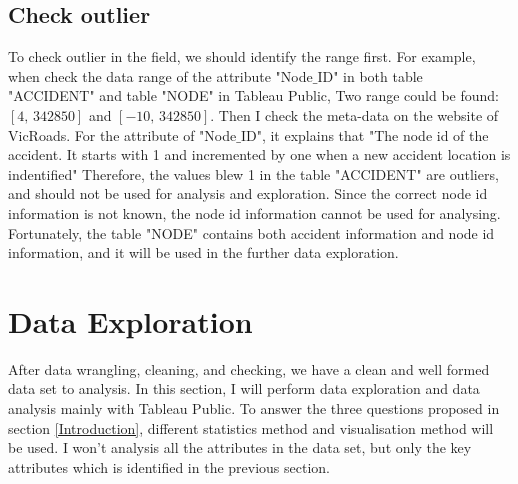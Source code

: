 \documentclass[11pt]{article}
\theoremstyle{definition}
\begin{document}
\subsection{Check outlier}
To check outlier in the field, we should identify the range first. For example, when check the data range of the attribute "Node$\_$ID" in both table "ACCIDENT" and table "NODE" in Tableau Public, Two range could be found: $[4,\,342850]$ and $[-10,\,342850]$. Then I check the meta-data on the website of VicRoads. For the attribute of "Node$\_$ID", it explains that "The node id of the accident. It starts with 1 and incremented by one when a new accident location is indentified" %
Therefore, the values blew 1 in the table "ACCIDENT" are outliers, and should not be used for analysis and exploration. Since the correct node id information is not known, the node id information cannot be used for analysing. Fortunately, the table "NODE" contains both accident information and node id information, and it will be used in the further data exploration.

\section{Data Exploration}
\label{dataExploration}
After data wrangling, cleaning, and checking, we have a clean and well formed data set to analysis. In this section, I will perform data exploration and data analysis mainly with Tableau Public. To answer the three questions proposed in section \ref{Introduction}, different statistics method and visualisation method will be used. I won't analysis all the attributes in the data set, but only the key attributes which is identified in the previous section.
\end{document}
